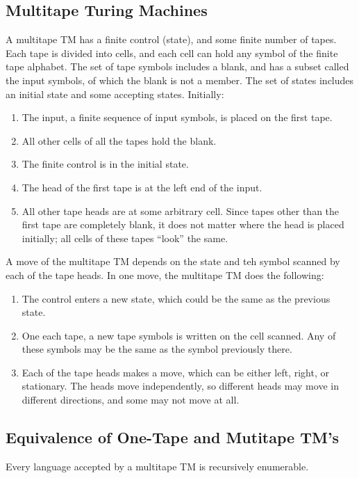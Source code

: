 \documentclass[]{article}
\begin{document}
\subsection*{Multitape Turing Machines}
A multitape TM has a finite control (state), and some finite number of tapes.
Each tape is divided into cells, and each cell can hold any symbol of the
finite tape alphabet. The set of tape symbols includes a blank, and has a
subset called the input symbols, of which the blank is not a member. The set
of states includes an initial state and some accepting states. Initially:
\begin{enumerate}
\item The input, a finite sequence of input symbols, is placed on the
first tape.
\item All other cells of all the tapes hold the blank.
\item The finite control is in the initial state.
\item The head of the first tape is at the left end of the input.
\item All other tape heads are at some arbitrary cell. Since tapes other
than the first tape are completely blank, it does not matter where the
head is placed initially; all cells of these tapes ``look'' the same.
\end{enumerate}

A move of the multitape TM depends on the state and teh symbol scanned by each
of the tape heads. In one move, the multitape TM does the following:
\begin{enumerate}
\item The control enters a new state, which could be the same as the
previous state.
\item One each tape, a new tape symbols is written on the cell scanned.
Any of these symbols may be the same as the symbol previously there.
\item Each of the tape heads makes a move, which can be either left,
right, or stationary. The heads move independently, so different heads may
move in different directions, and some may not move at all.
\end{enumerate}

\subsection*{Equivalence of One-Tape and Mutitape TM's}
\begin{thm}
Every language accepted by a multitape TM is recursively enumerable.
\end{thm}
\end{document}
